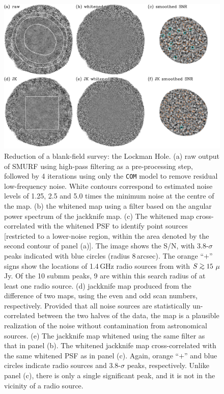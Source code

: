 \documentclass[useAMS,usenatbib,nofootinbib]{mn2e}
\def\gsim{\mathrel{\lower2.5pt\vbox{\lineskip=0pt\baselineskip=0pt
          \hbox{$>$}\hbox{$\sim$}}}}
\newcommand{\model}[1]{\texttt{#1}}
\begin{document}
\begin{figure}
\centering
\includegraphics[width=\linewidth]{lockman_maps.pdf}
\caption{Reduction of a blank-field survey: the Lockman Hole. (a) raw
  output of SMURF using high-pass filtering as a pre-processing step,
  followed by 4 iterations using only the \model{COM} model to remove
  residual low-frequency noise. White contours correspond to estimated
  noise levels of 1.25, 2.5 and 5.0 times the minimum noise at the
  centre of the map. (b) the whitened map using a filter based on the
  angular power spectrum of the jackknife map. (c) The whitened map
  cross-correlated with the whitened PSF to identify point sources
  [restricted to a lower-noise region, within the area denoted by the
  second contour of panel (a)]. The image shows the S/N, with
  3.8-$\sigma$ peaks indicated with blue circles (radius
  8\,arcsec). The orange ``$+$'' signs show the locations of 1.4\,GHz
  radio sources from \citet{owen2008} with $S\gsim15$\,$\mu$Jy. Of the
  10 submm peaks, 9 are within this search radius of at least one
  radio source. (d) jackknife map produced from the difference of two
  maps, using the even and odd scan numbers, respectively. Provided
  that all noise sources are statistically un-correlated between the
  two halves of the data, the map is a plausible realization of the
  noise without contamination from astronomical sources. (e) The
  jackknife map whitened using the same filter as that in panel
  (b). The whitened jackknife map cross-correlated with the same
  whitened PSF as in panel (c). Again, orange ``$+$'' and blue circles
  indicate radio sources and 3.8-$\sigma$ peaks, respectively. Unlike
  panel (c), there is only a single significant peak, and it is not in
  the vicinity of a radio source.}
\label{fig:lockman_maps}
\end{figure}
\end{document}
